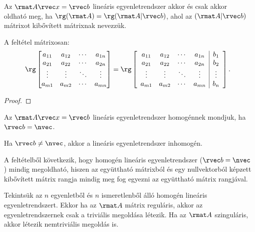 \begin{theorem}
  Az $\rmat A \rvec x = \rvec b$ lineáris egyenletrendszer akkor és csak
  akkor oldható meg, ha $\rg(\rmat A) = \rg(\rmat A | \rvec b)$, ahol az
  $(\rmat A | \rvec b)$ mátrixot kibővített mátrixnak nevezzük.

  A feltétel mátrixosan:
  $$
    \rg \begin{bmatrix}
      a_{11} & a_{12} & \cdots & a_{1n} \\
      a_{21} & a_{22} & \cdots & a_{2n} \\
      \vdots & \vdots & \ddots & \vdots \\
      a_{m1} & a_{m2} & \cdots & a_{mn}
    \end{bmatrix} = \rg \left[\begin{array}{cccc|c}
        a_{11} & a_{12} & \cdots & a_{1n} & b_1    \\
        a_{21} & a_{22} & \cdots & a_{2n} & b_2    \\
        \vdots & \vdots & \ddots & \vdots & \vdots \\
        a_{m1} & a_{m2} & \cdots & a_{mn} & b_n
      \end{array}\right]\text.
  $$

  \begin{proof}
    \vspace{8em}
  \end{proof}
\end{theorem}

\begin{definition}
  Az $\rmat A \rvec x = \rvec b$ lineáris egyenletrendszer homogénnek mondjuk,
  ha $\rvec b = \nvec$.

  Ha $\rvec b \neq \nvec$, akkor a lineáris egyenletrendszer inhomogén.
\end{definition}

\begin{note}
  A feltételből következik, hogy homogén lineáris egyenletrendszer
  ($\rvec b = \nvec$) mindig megoldható, hiszen az együttható mátrixból és egy
  nullvektorból képzett kibővített mátrix rangja mindig meg fog egyezni az
  együttható mátrix rangjával.
\end{note}

\begin{note}
  Tekintsük az $n$ egyenletből és $n$ ismeretlenből álló homogén lineáris
  egyenletrendszert. Ekkor ha az $\rmat A$ mátrix reguláris, akkor az
  egyenletrendszernek csak a triviális megoldása létezik. Ha az $\rmat A$
  szinguláris, akkor létezik nemtriviális megoldás is.
\end{note}

